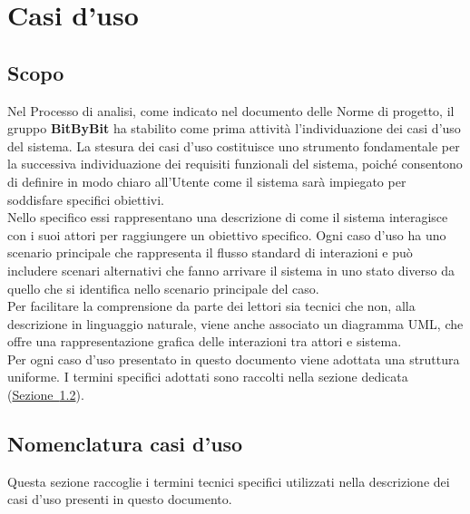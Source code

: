 \documentclass[a4paper,12pt]{article}
\begin{document}

\section{Casi d'uso}

\subsection{Scopo}
Nel Processo di analisi, come indicato nel documento delle Norme di progetto, il gruppo \textbf{BitByBit} ha stabilito come prima attività l'individuazione dei casi d'uso del sistema. La stesura dei casi d'uso costituisce uno strumento fondamentale per la successiva individuazione dei requisiti funzionali del sistema, poiché consentono di definire in modo chiaro all'Utente come il sistema sarà impiegato per soddisfare specifici obiettivi.\\
Nello specifico essi rappresentano una descrizione di come il sistema interagisce con i suoi attori per raggiungere un obiettivo specifico.
Ogni caso d'uso ha uno scenario principale che rappresenta il flusso standard di interazioni e può includere scenari alternativi che fanno arrivare il sistema in uno stato diverso da quello che si identifica nello scenario principale del caso.\\
Per facilitare la comprensione da parte dei lettori sia tecnici che non, alla descrizione in linguaggio naturale, viene anche associato un diagramma UML, che offre una rappresentazione grafica delle interazioni tra attori e sistema.\\
Per ogni caso d'uso presentato in questo documento viene adottata una struttura uniforme. I termini specifici adottati sono raccolti nella sezione dedicata (\hyperref[nomenclatura-casi-duso]{Sezione~\ref*{nomenclatura-casi-duso}}).

\subsection{Nomenclatura casi d'uso}
\label{nomenclatura-casi-duso}
Questa sezione raccoglie i termini tecnici specifici utilizzati nella descrizione dei casi d’uso presenti in questo documento.
\end{document}

